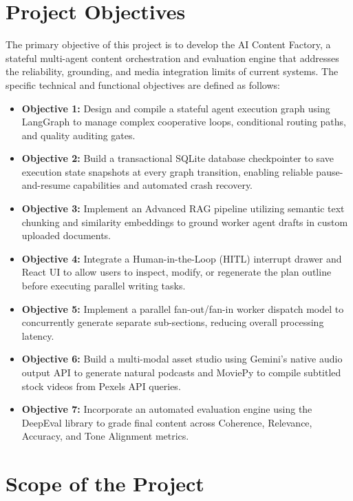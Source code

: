 \section{Project Objectives}

The primary objective of this project is to develop the AI Content Factory, a stateful multi-agent content orchestration and evaluation engine that addresses the reliability, grounding, and media integration limits of current systems. The specific technical and functional objectives are defined as follows:

\begin{itemize}
    \item \textbf{Objective 1:} Design and compile a stateful agent execution graph using LangGraph to manage complex cooperative loops, conditional routing paths, and quality auditing gates.
    \item \textbf{Objective 2:} Build a transactional SQLite database checkpointer to save execution state snapshots at every graph transition, enabling reliable pause-and-resume capabilities and automated crash recovery.
    \item \textbf{Objective 3:} Implement an Advanced RAG pipeline utilizing semantic text chunking and similarity embeddings to ground worker agent drafts in custom uploaded documents.
    \item \textbf{Objective 4:} Integrate a Human-in-the-Loop (HITL) interrupt drawer and React UI to allow users to inspect, modify, or regenerate the plan outline before executing parallel writing tasks.
    \item \textbf{Objective 5:} Implement a parallel fan-out/fan-in worker dispatch model to concurrently generate separate sub-sections, reducing overall processing latency.
    \item \textbf{Objective 6:} Build a multi-modal asset studio using Gemini's native audio output API to generate natural podcasts and MoviePy to compile subtitled stock videos from Pexels API queries.
    \item \textbf{Objective 7:} Incorporate an automated evaluation engine using the DeepEval library to grade final content across Coherence, Relevance, Accuracy, and Tone Alignment metrics.
\end{itemize}

\section{Scope of the Project}

